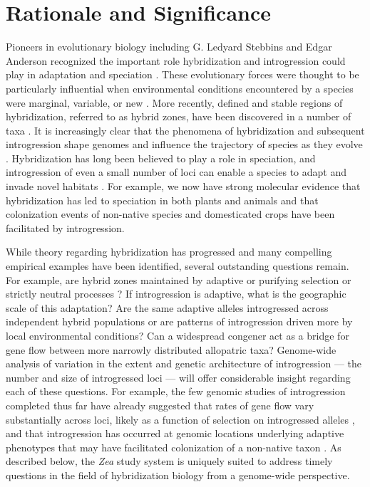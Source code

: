 \section*{Rationale and Significance} 
Pioneers in evolutionary biology including G. Ledyard Stebbins and Edgar Anderson recognized the important role hybridization and introgression could play in adaptation and speciation \citep{Anderson1948, Anderson1954}.
These evolutionary forces were thought to be particularly influential when environmental conditions encountered by a species were marginal, variable, or new \citep{Stebbins1959}.
More recently, defined and stable regions of hybridization, referred to as hybrid zones, have been discovered in a number of taxa \citep[reviewed in ][]{HarrisonHybridZone, shurtliff2013, abbott2014}. 
It is increasingly clear that the phenomena of hybridization and subsequent introgression shape genomes and influence the trajectory of species as they evolve \citep{Ellstrand2014}.
Hybridization has long been believed to play a role in speciation, and introgression of even a small number of loci can enable a species to adapt and invade novel habitats \citep{currat2008, abbott2013}.
For example, we now have strong molecular evidence that hybridization has led to speciation in both plants and animals \citep[reviewed in][]{mallet2007} and that colonization events of non-native species \citep{lucek2010} and domesticated crops \citep{he2011, Hufford2013} have been facilitated by introgression. 

While theory regarding hybridization has progressed and many compelling empirical examples have been identified, several outstanding questions remain. 
For example, are hybrid zones maintained by adaptive or purifying selection or strictly neutral processes \citep{Kruuk1999, Rasmussen2012, Smith2013b}? 
If introgression is adaptive, what is the geographic scale of this adaptation?
Are the same adaptive alleles introgressed across independent hybrid populations or are patterns of introgression driven more by local environmental conditions?
Can a widespread congener act as a bridge for gene flow between more narrowly distributed allopatric taxa?
Genome-wide analysis of variation in the extent and genetic architecture of introgression --- the number and size of introgressed loci ---  will offer considerable insight regarding each of these questions.  
For example, the few genomic studies of introgression completed thus far have already suggested that rates of gene flow vary substantially across loci, likely as a function of selection on introgressed alleles \citep{Hufford2013, Poelstra2014}, and that introgression has occurred at genomic locations underlying adaptive phenotypes that may have facilitated colonization of a non-native taxon \citep{Hufford2013}.
As described below, the \emph{Zea} study system is uniquely suited to address timely questions in the field of hybridization biology from a genome-wide perspective.

